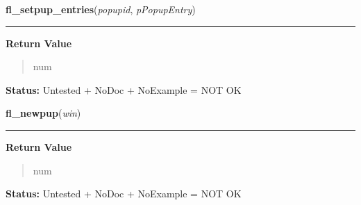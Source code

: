     \label{xformslib:library:fl_setpup_entries}

    \vspace{0.5ex}

\hspace{.8\funcindent}\begin{boxedminipage}{\funcwidth}

    \raggedright \textbf{fl\_setpup\_entries}(\textit{popupid}, \textit{pPopupEntry})

    \vspace{-1.5ex}

    \rule{\textwidth}{0.5\fboxrule}
\setlength{\parskip}{2ex}
\setlength{\parskip}{1ex}
      \textbf{Return Value}
    \vspace{-1ex}

      \begin{quote}
      num

      \end{quote}

\textbf{Status:} Untested + NoDoc + NoExample = NOT OK



    \end{boxedminipage}

    \label{xformslib:library:fl_newpup}

    \vspace{0.5ex}

\hspace{.8\funcindent}\begin{boxedminipage}{\funcwidth}

    \raggedright \textbf{fl\_newpup}(\textit{win})

    \vspace{-1.5ex}

    \rule{\textwidth}{0.5\fboxrule}
\setlength{\parskip}{2ex}
\setlength{\parskip}{1ex}
      \textbf{Return Value}
    \vspace{-1ex}

      \begin{quote}
      num

      \end{quote}

\textbf{Status:} Untested + NoDoc + NoExample = NOT OK



    \end{boxedminipage}

